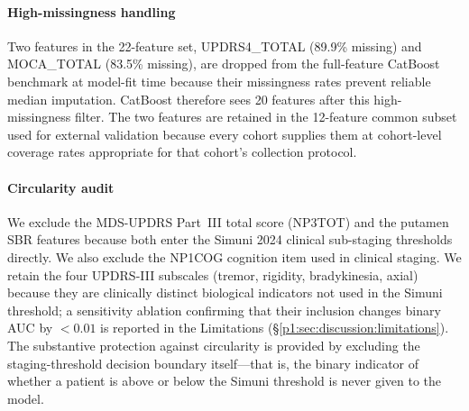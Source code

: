 \paragraph*{High-missingness handling} Two features in the 22-feature set, UPDRS4\_TOTAL (89.9\% missing) and MOCA\_TOTAL (83.5\% missing), are dropped from the full-feature CatBoost benchmark at model-fit time because their missingness rates prevent reliable median imputation. CatBoost therefore sees 20 features after this high-missingness filter. The two features are retained in the 12-feature common subset used for external validation because every cohort supplies them at cohort-level coverage rates appropriate for that cohort's collection protocol.

\paragraph*{Circularity audit} We exclude the MDS-UPDRS Part~III total score (NP3TOT) and the putamen SBR features because both enter the Simuni 2024 clinical sub-staging thresholds directly. We also exclude the NP1COG cognition item used in clinical staging. We retain the four UPDRS-III subscales (tremor, rigidity, bradykinesia, axial) because they are clinically distinct biological indicators not used in the Simuni threshold; a sensitivity ablation confirming that their inclusion changes binary AUC by ${<}0.01$ is reported in the Limitations (\S\ref{p1:sec:discussion:limitations}). The substantive protection against circularity is provided by excluding the staging-threshold decision boundary itself---that is, the binary indicator of whether a patient is above or below the Simuni threshold is never given to the model.

